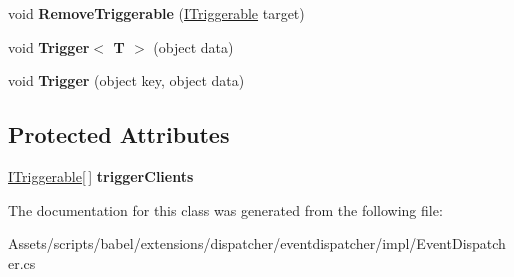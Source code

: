 \begin{DoxyCompactItemize}
\item 
\hypertarget{classbabel_1_1extensions_1_1dispatcher_1_1eventdispatcher_1_1impl_1_1_event_dispatcher_a96343db6aeb761802ce4221e6727f1b8}{void {\bfseries Remove\-Triggerable} (\hyperlink{interfacebabel_1_1extensions_1_1dispatcher_1_1api_1_1_i_triggerable}{I\-Triggerable} target)}\label{classbabel_1_1extensions_1_1dispatcher_1_1eventdispatcher_1_1impl_1_1_event_dispatcher_a96343db6aeb761802ce4221e6727f1b8}

\item 
\hypertarget{classbabel_1_1extensions_1_1dispatcher_1_1eventdispatcher_1_1impl_1_1_event_dispatcher_a886756ec05bb5d486af51897912b1e02}{void {\bfseries Trigger$<$ T $>$} (object data)}\label{classbabel_1_1extensions_1_1dispatcher_1_1eventdispatcher_1_1impl_1_1_event_dispatcher_a886756ec05bb5d486af51897912b1e02}

\item 
\hypertarget{classbabel_1_1extensions_1_1dispatcher_1_1eventdispatcher_1_1impl_1_1_event_dispatcher_a89b1da67fed12ce75e0775cb0d45c5fb}{void {\bfseries Trigger} (object key, object data)}\label{classbabel_1_1extensions_1_1dispatcher_1_1eventdispatcher_1_1impl_1_1_event_dispatcher_a89b1da67fed12ce75e0775cb0d45c5fb}

\end{DoxyCompactItemize}
\subsection*{Protected Attributes}
\begin{DoxyCompactItemize}
\item 
\hypertarget{classbabel_1_1extensions_1_1dispatcher_1_1eventdispatcher_1_1impl_1_1_event_dispatcher_a224d81717fb9b5b283057cf7915cac30}{\hyperlink{interfacebabel_1_1extensions_1_1dispatcher_1_1api_1_1_i_triggerable}{I\-Triggerable}\mbox{[}$\,$\mbox{]} {\bfseries trigger\-Clients}}\label{classbabel_1_1extensions_1_1dispatcher_1_1eventdispatcher_1_1impl_1_1_event_dispatcher_a224d81717fb9b5b283057cf7915cac30}

\end{DoxyCompactItemize}


The documentation for this class was generated from the following file\-:\begin{DoxyCompactItemize}
\item 
Assets/scripts/babel/extensions/dispatcher/eventdispatcher/impl/Event\-Dispatcher.\-cs\end{DoxyCompactItemize}
